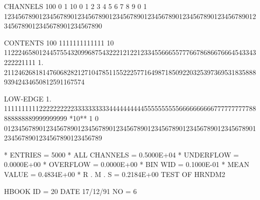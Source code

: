 \begin{Listing}
 CHANNELS 100   0                                                                                                  1   
           10   0        1         2         3         4         5         6         7         8         9         0   
            1   1234567890123456789012345678901234567890123456789012345678901234567890123456789012345678901234567890   
 
 CONTENTS 100                          1111111111111                                                                
           10                 112224658012445755432099687543222121221233455666557776678686676664543343222221111     
            1.       21124626818147606828212710478511552225771649871850922032539736953183588893942434650812591167574
 
 LOW-EDGE   1.            111111111122222222223333333333444444444455555555556666666666777777777788888888889999999999
 *10**  1   0   0123456789012345678901234567890123456789012345678901234567890123456789012345678901234567890123456789
 
 * ENTRIES =       5000      * ALL CHANNELS = 0.5000E+04      * UNDERFLOW = 0.0000E+00      * OVERFLOW = 0.0000E+00
 * BIN WID = 0.1000E-01      * MEAN VALUE   = 0.4834E+00      * R . M . S = 0.2184E+00
\newpage
 TEST OF HRNDM2                                                                  
 
 HBOOK     ID =        20                                        DATE  17/12/91              NO =   6
 

\end{Listing}
